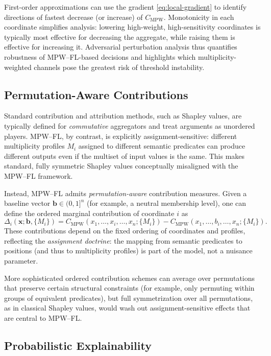 \documentclass[11pt]{article}
\begin{document}
First-order approximations can use the gradient \eqref{eq:local-gradient} to identify directions of fastest decrease (or increase) of $C_{\mathrm{MPW}}$. Monotonicity in each coordinate simplifies analysis: lowering high-weight, high-sensitivity coordinates is typically most effective for decreasing the aggregate, while raising them is effective for increasing it. Adversarial perturbation analysis thus quantifies robustness of MPW--FL-based decisions and highlights which multiplicity-weighted channels pose the greatest risk of threshold instability.

\subsection{Permutation-Aware Contributions}
\label{subsec:permutation-contributions}

Standard contribution and attribution methods, such as Shapley values, are typically defined for \emph{commutative} aggregators and treat arguments as unordered players. MPW--FL, by contrast, is explicitly assignment-sensitive: different multiplicity profiles $M_i$ assigned to different semantic predicates can produce different outputs even if the multiset of input values is the same. This makes standard, fully symmetric Shapley values conceptually misaligned with the MPW--FL framework.

Instead, MPW--FL admits \emph{permutation-aware} contribution measures. Given a baseline vector $\mathbf{b} \in (0,1]^n$ (for example, a neutral membership level), one can define the ordered marginal contribution of coordinate $i$ as
\[
  \Delta_i(\mathbf{x};\mathbf{b},\{M_i\})
  = C_{\mathrm{MPW}}(x_1,\dots,x_i,\dots,x_n;\{M_i\})
    - C_{\mathrm{MPW}}(x_1,\dots,b_i,\dots,x_n;\{M_i\}).
\]
These contributions depend on the fixed ordering of coordinates and profiles, reflecting the \emph{assignment doctrine}: the mapping from semantic predicates to positions (and thus to multiplicity profiles) is part of the model, not a nuisance parameter.

More sophisticated ordered contribution schemes can average over permutations that preserve certain structural constraints (for example, only permuting within groups of equivalent predicates), but full symmetrization over all permutations, as in classical Shapley values, would wash out assignment-sensitive effects that are central to MPW--FL.

\subsection{Probabilistic Explainability}
\label{subsec:probabilistic-explainability}
\end{document}
